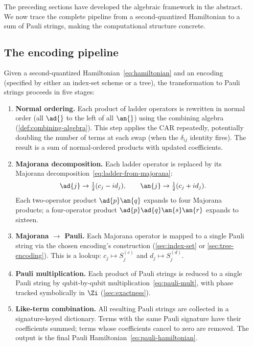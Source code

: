 %

The preceding sections have developed the algebraic framework in the
abstract.  We now trace the complete pipeline from a second-quantized
Hamiltonian to a sum of Pauli strings, making the computational
structure concrete.

\subsection{The encoding pipeline}
\label{sec:ham-pipeline}

Given a second-quantized Hamiltonian~\eqref{eq:hamiltonian} and an
encoding (specified by either an index-set scheme or a tree), the
transformation to Pauli strings proceeds in five stages:

\begin{enumerate}
  \item \textbf{Normal ordering.}  Each product of ladder operators
    is rewritten in normal order (all $\ad{}$ to the left of all
    $\an{}$) using the combining algebra
    (\cref{def:combining-algebra}).  This step applies the CAR
    repeatedly, potentially doubling the number of terms at each swap
    (when the $\delta_{ij}$ identity fires).  The result is a sum of
    normal-ordered products with updated coefficients.

  \item \textbf{Majorana decomposition.}  Each ladder operator is
    replaced by its Majorana decomposition~\eqref{eq:ladder-from-majorana}:
    \begin{equation*}
      \ad{j} \to \tfrac{1}{2}(c_j - id_j), \qquad
      \an{j} \to \tfrac{1}{2}(c_j + id_j).
    \end{equation*}
    Each two-operator product $\ad{p}\an{q}$ expands to four Majorana
    products; a four-operator product $\ad{p}\ad{q}\an{s}\an{r}$
    expands to sixteen.

  \item \textbf{Majorana $\to$ Pauli.}  Each Majorana operator is
    mapped to a single Pauli string via the chosen encoding's
    construction (\cref{sec:index-set} or \cref{sec:tree-encoding}).
    This is a lookup: $c_j \mapsto S_j^{(c)}$ and
    $d_j \mapsto S_j^{(d)}$.

  \item \textbf{Pauli multiplication.}  Each product of Pauli strings
    is reduced to a single Pauli string by qubit-by-qubit
    multiplication~\eqref{eq:pauli-mult}, with phase tracked
    symbolically in $\Zi$ (\cref{sec:exactness}).

  \item \textbf{Like-term combination.}  All resulting Pauli strings
    are collected in a signature-keyed dictionary.  Terms with the
    same Pauli signature have their coefficients summed; terms whose
    coefficients cancel to zero are removed.  The output is the
    final Pauli Hamiltonian~\eqref{eq:pauli-hamiltonian}.
\end{enumerate}

